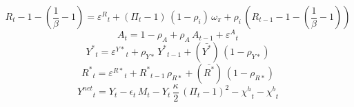 \begin{dmath}
{R}_{t}-1-\left(\frac{1}{{\beta}}-1\right)={\varepsilon^{R}}_{t}+\left({\Pi}_{t}-1\right)\, \left(1-{\rho_{i}}\right)\, {\omega_{\pi}}+{\rho_{i}}\, \left({R}_{t-1}-1-\left(\frac{1}{{\beta}}-1\right)\right)
\end{dmath}
\begin{dmath}
{A}_{t}=1-{\rho_{A}}+{\rho_{A}}\, {A}_{t-1}+{\varepsilon^{A}}_{t}
\end{dmath}
\begin{dmath}
{Y^{*}}_{t}={\varepsilon^{Y*}}_{t}+{\rho_{Y*}}\, {Y^{*}}_{t-1}+(\bar{Y^{*}})\, \left(1-{\rho_{Y*}}\right)
\end{dmath}
\begin{dmath}
{R^{*}}_{t}={\varepsilon^{R*}}_{t}+{R^{*}}_{t-1}\, {\rho_{R*}}+(\bar{R^{*}})\, \left(1-{\rho_{R*}}\right)
\end{dmath}
\begin{dmath}
{Y^{net}}_{t}={Y}_{t}-{\epsilon}_{t}\, {M}_{t}-{Y}_{t}\, \frac{{\kappa}}{2}\, \left({\Pi}_{t}-1\right)^{2}-{\chi^{h}}_{t}-{\chi^{b}}_{t}
\end{dmath}

